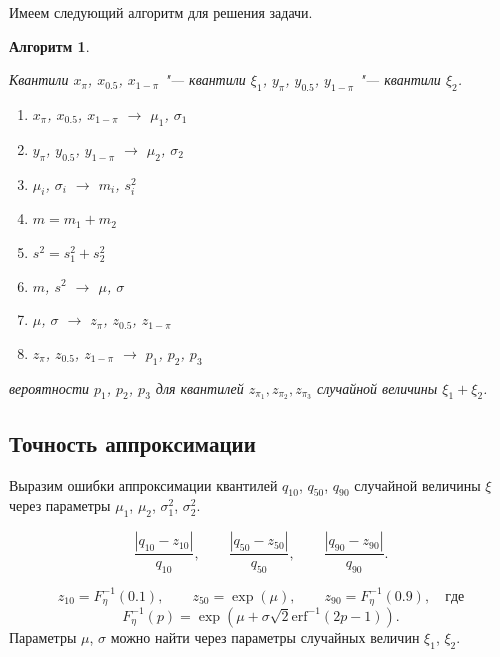 \documentclass[12pt]{article}
\newtheorem{alg}{Алгоритм}
\newenvironment{pr1}{\par\noindent{\bf Дано:}}{}
\newenvironment{pr3}{\par\noindent{\bf Результат:}}{}
\begin{document}
	Имеем следующий алгоритм для решения задачи.
	
	\begin{alg}\label{al3}
		\begin{pr1}
			Квантили $x_{\pi}$, $x_{0.5}$, $x_{1-\pi}$ "--- квантили $\xi_{1}$, $y_{\pi}$, $y_{0.5}$, $y_{1-\pi}$ "--- квантили $\xi_{2}$.
		\end{pr1}
		\begin{enumerate}
			\item $x_{\pi}$, $x_{0.5}$, $x_{1-\pi}$ $\rightarrow$  $\mu_{1}$, $\sigma_{1}$
			\item $y_{\pi}$, $y_{0.5}$, $y_{1-\pi}$ $\rightarrow$ $\mu_{2}$, $\sigma_{2}$
			\item $\mu_{i}$, $\sigma_{i}$ $\rightarrow$ $m_{i}$, $s_{i}^{2}$
			\item $m = m_{1}+m_{2}$
			\item $s^{2}=s_{1}^{2} + s_{2}^{2}$
			\item $m$, $s^{2}$ $\rightarrow$ $\mu$, $\sigma$
			\item $\mu$, $\sigma$ $\rightarrow$ $z_{\pi}$, $z_{0.5}$, $z_{1-\pi}$
			\item $z_{\pi}$, $z_{0.5}$, $z_{1-\pi}$ $\rightarrow$ $p_{1}$, $p_{2}$, $p_{3}$
		\end{enumerate}
		
		\begin{pr3}\end{pr3} вероятности $p_{1}$, $p_{2}$, $p_{3}$ для квантилей $z_{\pi_{1}}, z_{\pi_{2}}, z_{\pi_{3}}$ случайной величины $\xi_{1} + \xi_{2}$.
		
	\end{alg}
	
	\subsection{Точность аппроксимации}
	
	Выразим ошибки аппроксимации квантилей $q_{10}$, $q_{50}$, $q_{90}$ случайной величины $\xi$ через параметры $\mu_{1}$, $\mu_{2}$, $\sigma_{1}^{2}$, $\sigma_{2}^{2}$.
	
	\[\dfrac{\left| q_{10} - z_{10}\right|}{q_{10}}, \quad\quad \dfrac{\left| q_{50} - z_{50}\right|}{q_{50}}, \quad\quad \dfrac{\left| q_{90} - z_{90}\right|}{q_{90}}.\]
	
	\[z_{10} = F_{\eta}^{-1}(0.1), \quad\quad z_{50} = \exp(\mu), \quad\quad z_{90} = F_{\eta}^{-1}(0.9), \quad где\]
	\[F_{\eta}^{-1}(p) = \exp(\mu+\sigma\sqrt{2}\mathrm{erf}^{-1}(2p-1)).\]
	Параметры $\mu$, $\sigma$ можно найти через параметры случайных величин $\xi_{1}$, $\xi_{2}$.
	
\end{document}
